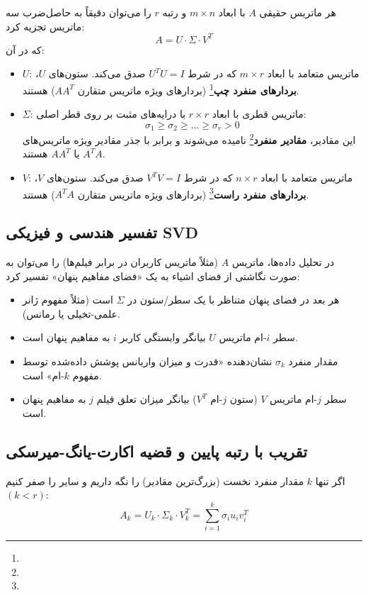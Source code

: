 \begin{theorem}
هر ماتریس حقیقی $A$ با ابعاد $m \times n$ و رتبه $r$ را می‌توان دقیقاً به حاصل‌ضرب سه ماتریس تجزیه کرد:
\begin{equation}
A = U \cdot \Sigma \cdot V^T
\end{equation}
که در آن:
\begin{itemize}
    \item $U$: ماتریس متعامد با ابعاد $m \times r$ که در شرط $U^T U = I$ صدق می‌کند. ستون‌های $U$، \textbf{بردارهای منفرد چپ}\footnote{} (بردارهای ویژه ماتریس متقارن $A A^T$) هستند.
    \item $\Sigma$: ماتریس قطری با ابعاد $r \times r$ با درایه‌های مثبت بر روی قطر اصلی:
    \begin{equation}
    \sigma_1 \ge \sigma_2 \ge \dots \ge \sigma_r > 0
    \end{equation}
    این مقادیر، \textbf{مقادیر منفرد}\footnote{} نامیده می‌شوند و برابر با جذر مقادیر ویژه ماتریس‌های $A^T A$ یا $A A^T$ هستند.
    \item $V$: ماتریس متعامد با ابعاد $n \times r$ که در شرط $V^T V = I$ صدق می‌کند. ستون‌های $V$، \textbf{بردارهای منفرد راست}\footnote{} (بردارهای ویژه ماتریس متقارن $A^T A$) هستند.
\end{itemize}
\end{theorem}

\subsection{تفسیر هندسی و فیزیکی SVD}
در تحلیل داده‌ها، ماتریس $A$ (مثلاً ماتریس کاربران در برابر فیلم‌ها) را می‌توان به صورت نگاشتی از فضای اشیاء به یک «فضای مفاهیم پنهان» تفسیر کرد:
\begin{itemize}
    \item هر بعد در فضای پنهان متناظر با یک سطر/ستون در $\Sigma$ است (مثلاً مفهوم ژانر علمی-تخیلی یا رمانس).
    \item سطر $i$-ام ماتریس $U$ بیانگر وابستگی کاربر $i$ به مفاهیم پنهان است.
    \item مقدار منفرد $\sigma_k$ نشان‌دهنده «قدرت و میزان واریانس پوشش داده‌شده توسط مفهوم $k$-ام» است.
    \item سطر $j$-ام ماتریس $V$ (ستون $j$-ام $V^T$) بیانگر میزان تعلق فیلم $j$ به مفاهیم پنهان است.
\end{itemize}

\subsection{تقریب با رتبه پایین و قضیه اکارت-یانگ-میرسکی}
اگر تنها $k$ مقدار منفرد نخست (بزرگ‌ترین مقادیر) را نگه داریم و سایر را صفر کنیم $(k < r)$:
\begin{equation}
A_k = U_k \cdot \Sigma_k \cdot V_k^T = \sum_{i=1}^k \sigma_i u_i v_i^T
\end{equation}

